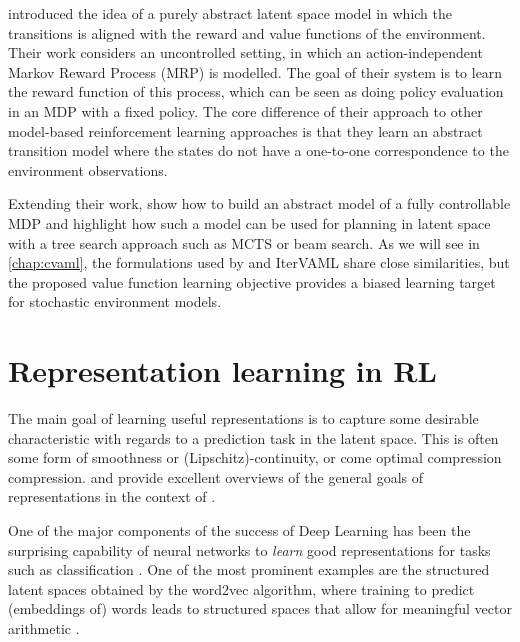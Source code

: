 \textcite{silver2017predictron} introduced the idea of a purely abstract latent space model in which the transitions is aligned with the reward and value functions of the environment.
Their work considers an uncontrolled setting, in which an action-independent Markov Reward Process (MRP) is modelled.
The goal of their system is to learn the reward function of this process, which can be seen as doing policy evaluation in an MDP with a fixed policy.
The core difference of their approach to other model-based reinforcement learning approaches is that they learn an abstract transition model where the states do not have a one-to-one correspondence to the environment observations.

Extending their work, \textcite{oh2017value} show how to build an abstract model of a fully controllable MDP and highlight how such a model can be used for planning in latent space with a tree search approach such as MCTS \parencite{schrittwieser2020mastering} or beam search.
As we will see in \autoref{chap:cvaml}, the formulations used by \textcite{silver2017predictron,schrittwieser2020mastering} and IterVAML share close similarities, but the proposed value function learning objective provides a biased learning target for stochastic environment models.

\section{Representation learning in RL}

The main goal of learning useful representations is to capture some desirable characteristic with regards to a prediction task in the latent space.
This is often some form of smoothness or (Lipschitz)-continuity, or come optimal compression compression.
\textcite{abel2020thesis} and \textcite{le2021metrics} provide excellent overviews of the general goals of representations in the context of .

One of the major components of the success of Deep Learning has been the surprising capability of neural networks to \emph{learn} good representations for tasks such as classification \parencite{bengio2012representation}.
One of the most prominent examples are the structured latent spaces obtained by the word2vec algorithm, where training to predict (embeddings of) words leads to structured spaces that allow for meaningful vector arithmetic \parencite{mikolov2013distributed,goldberg2014word2vec}.

